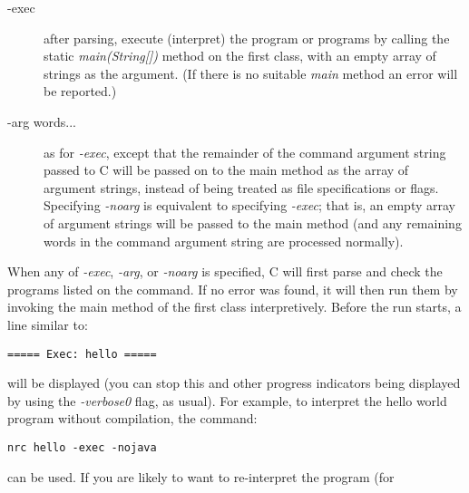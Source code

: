 \begin{description}
\item[-exec]
after parsing, execute (interpret) the program or programs by calling
the static \emph{main(String[])} method on the first class, with an
empty array of strings as the argument.  (If there is no suitable \emph{main}
method an error will be reported.)
\item[-arg words...]
as for \emph{-exec}, except that the remainder of the command argument
string passed to \nr{}C will be passed on to the main method as the
array of argument strings, instead of being treated as file
specifications or flags.  Specifying \emph{-noarg} is equivalent to
specifying \emph{-exec}; that is, an empty array of argument strings
will be passed to the main method (and any remaining words in the
command argument string are processed normally).
\end{description}
When any of \emph{-exec}, \emph{-arg}, or \emph{-noarg} is specified,
\nr{}C will first parse and check the programs listed on the command.
If no error was found, it will then run them by invoking the main method
of the first class interpretively.
\newline
Before the run starts, a line similar to:
\begin{verbatim}
===== Exec: hello =====
\end{verbatim}
will be displayed (you can stop this and other progress indicators being
displayed by using the \emph{-verbose0} flag, as usual).
\newline
{}
\newline
For example, to interpret the hello world program without
compilation, the command:
\begin{verbatim}
nrc hello -exec -nojava
\end{verbatim}
can be used.  If you are likely to want to re-interpret the program (for
